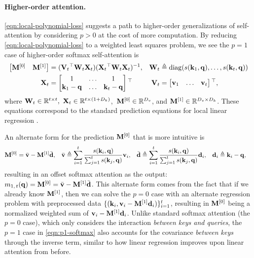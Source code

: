 \documentclass[notitlepage, 11pt]{article}
\newcommand*{\dkey}{{D_k}}
\newcommand*{\dval}{{D_v}}
\begin{document}
\paragraph{Higher-order attention.}
\autoref{eqn:local-polynomial-loss} suggests a path to higher-order generalizations of self-attention by considering $p > 0$ at the cost of more computation.
By reducing \autoref{eqn:local-polynomial-loss} to a weighted least squares problem, we see the $p=1$ case of higher-order softmax self-attention is
\begin{align}
    \bmat{\Mbf^{[0]} & \Mbf^{[1]}} &= (\Vbf_t\transpose \Wbf_t \Xbf_t)(\Xbf_t\transpose \Wbf_t \Xbf_t)\inverse, &
    \Wbf_t &\triangleq \diag{s(\kbf_1, \qbf), \ldots, s(\kbf_t, \qbf)} \label{eqn:p1-softmax}\\
    \Xbf_t &= \bmat{1 & \ldots & 1\\ \kbf_1 - \qbf & \ldots & \kbf_t - \qbf}\transpose &
    \Vbf_t &= \bmat{\vbf_1 & \ldots & \vbf_t}\transpose,
\end{align}
where $\Wbf_t\in \reals^{t\times t},\ \Xbf_t \in \reals^{t\times (1 + \dkey)}$,\ $\Mbf^{[0]} \in \reals^{\dval}$, and $\Mbf^{[1]} \in \reals^{\dval \times \dkey}$.
These equations correspond to the standard prediction equations for local linear regression \citep{Fan2018LocalPolynomialModelling}.

An alternate form for the prediction $\mathbf{M}^{[0]}$ that is more intuitive is
\begin{align}
    \mathbf{M}^{[0]} &= \bar{\mathbf{v}} - \mathbf{M}^{[1]}\bar{\mathbf{d}},&
    \bar{\mathbf{v}} &\triangleq \sum_{i=1}^t \frac{s(\mathbf{k}_i, \mathbf{q})}{\sum_{j=1}^t s(\mathbf{k}_j, \mathbf{q})} \mathbf{v}_i, &
    \bar{\mathbf{d}} &\triangleq \sum_{i=1}^t \frac{s(\mathbf{k}_i, \mathbf{q})}{\sum_{j=1}^t s(\mathbf{k}_j, \mathbf{q})} \mathbf{d}_i, &
    \mathbf{d}_i &\triangleq \mathbf{k}_i - \mathbf{q},
\end{align}
resulting in an offset softmax attention as the output: $m_{1,\, t}(\mathbf{q}) = \mathbf{M}^{[0]} = \bar{\mathbf{v}} - \mathbf{M}^{[1]}\bar{\mathbf{d}}$.
This alternate form comes from the fact that if we already know $\mathbf{M}^{[1]}$, then we can solve the $p=0$ case with an alternate regression problem with preprocessed data $\{(\mathbf{k}_i, \mathbf{v}_i - \mathbf{M}^{[1]}\mathbf{d}_i)\}_{i=1}^t$, resulting in $\mathbf{M}^{[0]}$ being a normalized weighted sum of $\mathbf{v}_i - \mathbf{M}^{[1]}\mathbf{d}_i$.
Unlike standard softmax attention (the $p=0$ case), which only considers the interaction \emph{between keys and queries}, the $p=1$ case in \autoref{eqn:p1-softmax} also accounts for the covariance \emph{between keys} through the inverse term, similar to how linear regression improves upon linear attention from before.
\end{document}
